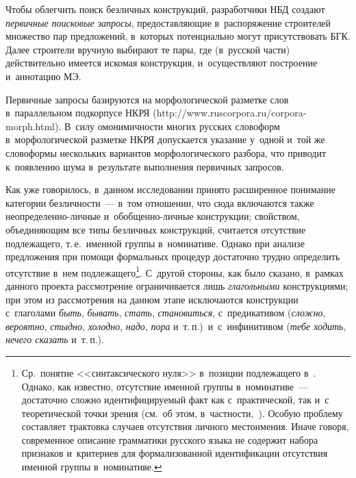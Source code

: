 \begin{multicols}{2}
  Чтобы облегчить поиск безличных конструкций, разработчики НБД создают 
\textit{первичные поисковые запросы}, предоставляющие в~распоряжение 
строителей множество пар предложений, в~которых потенциально могут 
присутствовать БГК. Далее строители вручную 
выбирают те пары, где (в~русской части) действительно имеется искомая 
конструкция, и~осуществляют построение и~аннотацию МЭ.
  
  Первичные запросы базируются на морфологической разметке слов 
в~параллельном подкорпусе НКРЯ ({\sf http://www.ruscorpora.ru/corpora-
morph.html}). В~силу омонимичности многих русских словоформ 
в~морфологической разметке НКРЯ допускается указание у~одной и~той же 
словоформы нескольких вариантов морфологического разбора, что приводит 
к~появлению шума в~результате выполнения первичных запросов.
  
  Как уже говорилось, в~данном исследовании принято расширенное 
понимание категории безличности~--- в~том отношении, что сюда включаются 
также неопределенно-личные и~обоб\-щен\-но-лич\-ные конструкции; 
свойством, объединяющим все типы безличных конструкций, считается 
отсутствие подлежащего, т.\,е.\ именной группы в~номинативе. Однако при 
анализе предложения при помощи формальных процедур достаточно трудно 
определить отсутствие в~нем подлежащего\footnote{Ср.\ понятие <<синтаксического 
нуля>> в~позиции подлежащего в~\cite{17-kr}. Однако, как известно, отсутствие именной группы 
в~номинативе~--- достаточно сложно идентифицируемый факт как с~практической, так и~с теоретической точки 
зрения (см.\ об этом, в~частности,~\cite{18-kr, 19-kr}). Особую проблему составляет трактовка случаев 
отсутствия личного местоимения. Иначе говоря, современное описание грамматики русского языка не 
содержит набора признаков и~критериев для формализованной идентификации отсутствия именной группы 
в~номинативе.}. С~другой стороны, как было сказано, в~рамках данного проекта 
рассмотрение ограничивается лишь \textit{глагольными} конструкциями; при 
этом из рассмотрения на данном этапе исключаются конструкции с~глаголами 
\textit{быть}, \textit{бывать}, \textit{стать}, \textit{становиться}, 
с~предикативом (\textit{сложно}, \textit{вероятно}, \textit{стыдно}, 
\textit{холодно}, \textit{надо}, \textit{пора} и~т.\,п.)\ и~с~инфинитивом 
(\textit{тебе ходить}, \textit{нечего сказать} и~т.\,п.).
  

\end{multicols}
